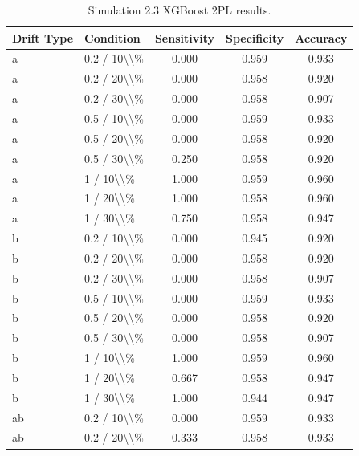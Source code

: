 \begin{table}[!h]
\centering
\caption{\label{tab:tab:sim23_xgb_2pl}Simulation 2.3 XGBoost 2PL results.}
\centering
\begin{tabular}[t]{llccc}
\toprule
Drift Type & Condition & Sensitivity & Specificity & Accuracy\\
\midrule
a & 0.2 / 10\textbackslash{}\textbackslash{}\% & 0.000 & 0.959 & 0.933\\
a & 0.2 / 20\textbackslash{}\textbackslash{}\% & 0.000 & 0.958 & 0.920\\
a & 0.2 / 30\textbackslash{}\textbackslash{}\% & 0.000 & 0.958 & 0.907\\
a & 0.5 / 10\textbackslash{}\textbackslash{}\% & 0.000 & 0.959 & 0.933\\
a & 0.5 / 20\textbackslash{}\textbackslash{}\% & 0.000 & 0.958 & 0.920\\
\addlinespace
a & 0.5 / 30\textbackslash{}\textbackslash{}\% & 0.250 & 0.958 & 0.920\\
a & 1 / 10\textbackslash{}\textbackslash{}\% & 1.000 & 0.959 & 0.960\\
a & 1 / 20\textbackslash{}\textbackslash{}\% & 1.000 & 0.958 & 0.960\\
a & 1 / 30\textbackslash{}\textbackslash{}\% & 0.750 & 0.958 & 0.947\\
b & 0.2 / 10\textbackslash{}\textbackslash{}\% & 0.000 & 0.945 & 0.920\\
\addlinespace
b & 0.2 / 20\textbackslash{}\textbackslash{}\% & 0.000 & 0.958 & 0.920\\
b & 0.2 / 30\textbackslash{}\textbackslash{}\% & 0.000 & 0.958 & 0.907\\
b & 0.5 / 10\textbackslash{}\textbackslash{}\% & 0.000 & 0.959 & 0.933\\
b & 0.5 / 20\textbackslash{}\textbackslash{}\% & 0.000 & 0.958 & 0.920\\
b & 0.5 / 30\textbackslash{}\textbackslash{}\% & 0.000 & 0.958 & 0.907\\
\addlinespace
b & 1 / 10\textbackslash{}\textbackslash{}\% & 1.000 & 0.959 & 0.960\\
b & 1 / 20\textbackslash{}\textbackslash{}\% & 0.667 & 0.958 & 0.947\\
b & 1 / 30\textbackslash{}\textbackslash{}\% & 1.000 & 0.944 & 0.947\\
ab & 0.2 / 10\textbackslash{}\textbackslash{}\% & 0.000 & 0.959 & 0.933\\
ab & 0.2 / 20\textbackslash{}\textbackslash{}\% & 0.333 & 0.958 & 0.933\\

\end{tabular}
\end{table}
